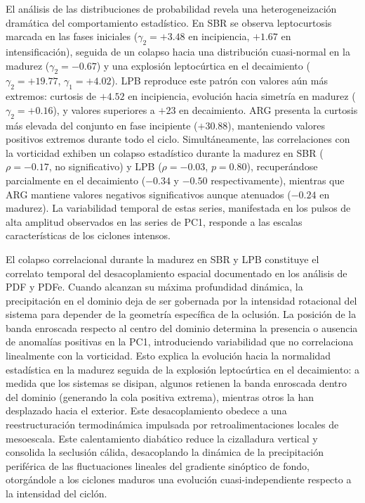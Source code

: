El análisis de las distribuciones de probabilidad revela una heterogeneización dramática del comportamiento estadístico. 
En SBR se observa leptocurtosis marcada en las fases iniciales ($\gamma_2 = +3.48$ en incipiencia, $+1.67$ en intensificación), seguida de un colapso hacia una distribución cuasi-normal en la madurez ($\gamma_2 = -0.67$) y una explosión leptocúrtica en el decaimiento ($\gamma_2 = +19.77$, $\gamma_1 = +4.02$). 
LPB reproduce este patrón con valores aún más extremos: curtosis de $+4.52$ en incipiencia, evolución hacia simetría en madurez ($\gamma_2 = +0.16$), y valores superiores a $+23$ en decaimiento. 
ARG presenta la curtosis más elevada del conjunto en fase incipiente ($+30.88$), manteniendo valores positivos extremos durante todo el ciclo. 
Simultáneamente, las correlaciones con la vorticidad exhiben un colapso estadístico durante la madurez en SBR ($\rho = -0.17$, no significativo) y LPB ($\rho = -0.03$, $p = 0.80$), recuperándose parcialmente en el decaimiento ($-0.34$ y $-0.50$ respectivamente), mientras que ARG mantiene valores negativos significativos aunque atenuados ($-0.24$ en madurez).
La variabilidad temporal de estas series, manifestada en los pulsos de alta amplitud observados en las series de PC1, responde a las escalas características de los ciclones intensos. 

El colapso correlacional durante la madurez en SBR y LPB constituye el correlato temporal del desacoplamiento espacial documentado en los análisis de PDF y PDFe. 
Cuando  alcanzan su máxima profundidad dinámica, la precipitación en el dominio deja de ser gobernada por la intensidad rotacional del sistema para depender de la geometría específica de la oclusión. 
La posición de la banda enroscada respecto al centro del dominio determina la presencia o ausencia de anomalías positivas en la PC1, introduciendo variabilidad que no correlaciona linealmente con la vorticidad. 
Esto explica la evolución hacia la normalidad estadística en la madurez seguida de la explosión leptocúrtica en el decaimiento: a medida que los sistemas se disipan, algunos retienen la banda enroscada dentro del dominio (generando la cola positiva extrema), mientras otros la han desplazado hacia el exterior.
Este desacoplamiento obedece a una reestructuración termodinámica impulsada por retroalimentaciones locales de mesoescala. 
Este calentamiento diabático reduce la cizalladura vertical y consolida la seclusión cálida, desacoplando la dinámica de la precipitación periférica de las fluctuaciones lineales del gradiente sinóptico de fondo, otorgándole a los ciclones maduros una evolución cuasi-independiente respecto a la intensidad del ciclón.

